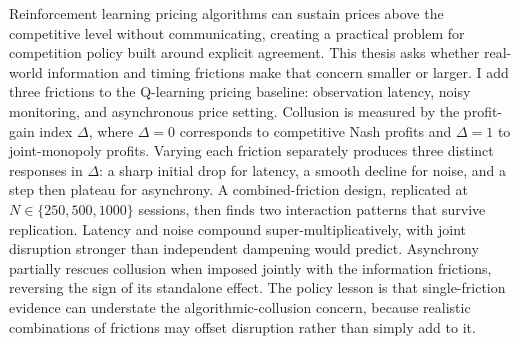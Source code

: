 Reinforcement learning pricing algorithms can sustain prices above the competitive level without communicating, creating a practical problem for competition policy built around explicit agreement. This thesis asks whether real-world information and timing frictions make that concern smaller or larger. I add three frictions to the \citet{calvano2020} Q-learning pricing baseline: observation latency, noisy monitoring, and asynchronous price setting. Collusion is measured by the profit-gain index $\Delta$, where $\Delta=0$ corresponds to competitive Nash profits and $\Delta=1$ to joint-monopoly profits. Varying each friction separately produces three distinct responses in $\Delta$: a sharp initial drop for latency, a smooth decline for noise, and a step then plateau for asynchrony. A combined-friction design, replicated at $N\in\{250,500,1000\}$ sessions, then finds two interaction patterns that survive replication. Latency and noise compound super-multiplicatively, with joint disruption stronger than independent dampening would predict. Asynchrony partially rescues collusion when imposed jointly with the information frictions, reversing the sign of its standalone effect. The policy lesson is that single-friction evidence can understate the algorithmic-collusion concern, because realistic combinations of frictions may offset disruption rather than simply add to it.
